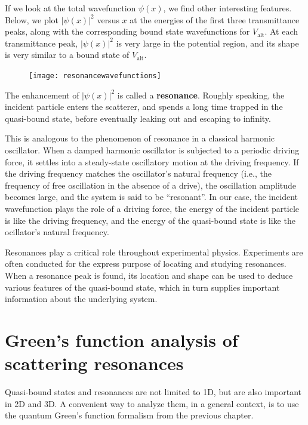 \documentclass[pra,12pt]{revtex4}
\begin{document}
If we look at the total wavefunction $\psi(x)$, we find other
interesting features.  Below, we plot $|\psi(x)|^2$ versus $x$ at the
energies of the first three transmittance peaks, along with the
corresponding bound state wavefunctions for $V_{\mathrm{alt}}$.  At
each transmittance peak, $|\psi(x)|^2$ is very large in the potential
region, and its shape is very similar to a bound state of
$V_{\mathrm{alt}}$.

\begin{figure}[h]
  \centering\texttt{[image: resonancewavefunctions]}
\end{figure}

\noindent
The enhancement of $|\psi(x)|^2$ is called a \textbf{resonance}.
Roughly speaking, the incident particle enters the scatterer, and
spends a long time trapped in the quasi-bound state, before eventually
leaking out and escaping to infinity.

This is analogous to the phenomenon of resonance in a classical
harmonic oscillator.  When a damped harmonic oscillator is subjected
to a periodic driving force, it settles into a steady-state
oscillatory motion at the driving frequency.  If the driving frequency
matches the oscillator's natural frequency (i.e., the frequency of
free oscillation in the absence of a drive), the oscillation amplitude
becomes large, and the system is said to be ``resonant''.  In our
case, the incident wavefunction plays the role of a driving force, the
energy of the incident particle is like the driving frequency, and the
energy of the quasi-bound state is like the ocillator's natural
frequency.

Resonances play a critical role throughout experimental physics.
Experiments are often conducted for the express purpose of locating
and studying resonances.  When a resonance peak is found, its location
and shape can be used to deduce various features of the quasi-bound
state, which in turn supplies important information about the
underlying system.

\section{Green's function analysis of scattering resonances}
\label{sec:green_resonances}

Quasi-bound states and resonances are not limited to 1D, but are also
important in 2D and 3D.  A convenient way to analyze them, in a
general context, is to use the quantum Green's function formalism from
the previous chapter.
\end{document}
